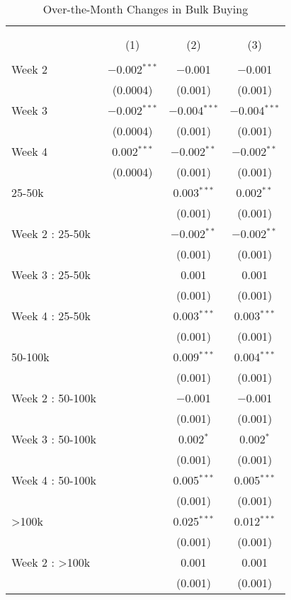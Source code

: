 \begin{table}[!htbp] \centering
  \caption{Over-the-Month Changes in Bulk Buying}
  \label{tab:discountingBehaviorLiquidity}
\begin{tabular}{@{\extracolsep{5pt}}lccc}
\\[-1.8ex]\hline
\hline \\[-1.8ex]
\\[-1.8ex] & (1) & (2) & (3)\\
\hline \\[-1.8ex]
 Week 2 & $-$0.002$^{***}$ & $-$0.001 & $-$0.001 \\
  & (0.0004) & (0.001) & (0.001) \\
  Week 3 & $-$0.002$^{***}$ & $-$0.004$^{***}$ & $-$0.004$^{***}$ \\
  & (0.0004) & (0.001) & (0.001) \\
  Week 4 & 0.002$^{***}$ & $-$0.002$^{**}$ & $-$0.002$^{**}$ \\
  & (0.0004) & (0.001) & (0.001) \\
  25-50k &  & 0.003$^{***}$ & 0.002$^{**}$ \\
  &  & (0.001) & (0.001) \\
  Week 2 : 25-50k &  & $-$0.002$^{**}$ & $-$0.002$^{**}$ \\
  &  & (0.001) & (0.001) \\
  Week 3 : 25-50k &  & 0.001 & 0.001 \\
  &  & (0.001) & (0.001) \\
  Week 4 : 25-50k &  & 0.003$^{***}$ & 0.003$^{***}$ \\
  &  & (0.001) & (0.001) \\
  50-100k &  & 0.009$^{***}$ & 0.004$^{***}$ \\
  &  & (0.001) & (0.001) \\
  Week 2 : 50-100k &  & $-$0.001 & $-$0.001 \\
  &  & (0.001) & (0.001) \\
  Week 3 : 50-100k &  & 0.002$^{*}$ & 0.002$^{*}$ \\
  &  & (0.001) & (0.001) \\
  Week 4 : 50-100k &  & 0.005$^{***}$ & 0.005$^{***}$ \\
  &  & (0.001) & (0.001) \\
  >100k &  & 0.025$^{***}$ & 0.012$^{***}$ \\
  &  & (0.001) & (0.001) \\
  Week 2 : >100k &  & 0.001 & 0.001 \\
  &  & (0.001) & (0.001) \\

\end{tabular}
\end{table}
